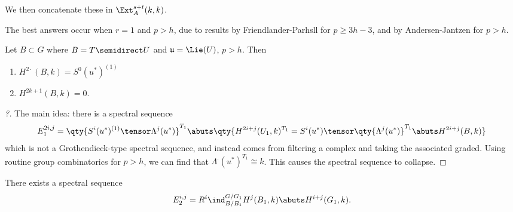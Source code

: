 We then concatenate these in \(\Ext_A^{s+t}(k, k)\).

The best answers occur when \(r=1\) and \(p>h\), due to results by
Friendlander-Parhsll for \(p\geq 3h-3\), and by Andersen-Jantzen for
\(p>h\).

\begin{proposition}[?]

Let \(B \subset G\) where \(B = T\semidirect U\) and
\(\mathfrak{u} = \Lie(U)\), \(p> h\). Then

\begin{enumerate}
\def\labelenumi{\arabic{enumi}.}
\item
  \(H^{2\cdot}(B, k) = S^0(u^*)^{(1)}\)
\item
  \(H^{2k+1}(B, k) = 0\).
\end{enumerate}

\end{proposition}

\begin{proof}[?]

The main idea: there is a spectral sequence
\begin{align*}  
E_1^{2i, j} = \qty{  
S^i(u^*)^{(1)} \tensor \Lambda^j(u^*)
}^{T_1}
\abuts
\qty{ 
H^{2i+j}(U_1, k)^{T_1} = S^i(u^*) \tensor \qty{ \Lambda^j(u^*) }^{T_1} \abuts H^{2i+j}(B, k)
}
\end{align*} which is not a Grothendieck-type spectral sequence, and
instead comes from filtering a complex and taking the associated graded.
Using routine group combinatorics for \(p>h\), we can find that
\(\Lambda^\cdot(u^*)^{T_1} \cong k\). This causes the spectral sequence
to collapse.

\end{proof}

\begin{proposition}[?]

There exists a spectral sequence
\begin{align*}  
E_2^{i, j} = R^i \ind_{B/B_1}^{G/G_1} H^j(B_1, k) \abuts H^{i+j}(G_1, k)
.\end{align*}

\end{proposition}

